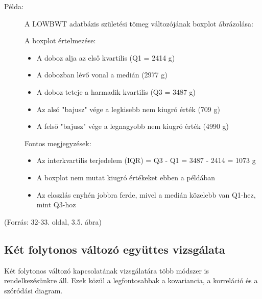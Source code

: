 \documentclass[a4paper,12pt]{article}
\begin{document}
\begin{description}
\item[Példa:] A LOWBWT adatbázis születési tömeg változójának boxplot ábrázolása:

\begin{center}
\end{center}

A boxplot értelmezése:
\begin{itemize}
    \item A doboz alja az első kvartilis (Q1 = 2414 g)
    \item A dobozban lévő vonal a medián (2977 g)
    \item A doboz teteje a harmadik kvartilis (Q3 = 3487 g)
    \item Az alsó "bajusz" vége a legkisebb nem kiugró érték (709 g)
    \item A felső "bajusz" vége a legnagyobb nem kiugró érték (4990 g)
\end{itemize}

Fontos megjegyzések:
\begin{itemize}
    \item Az interkvartilis terjedelem (IQR) = Q3 - Q1 = 3487 - 2414 = 1073 g
    \item A boxplot nem mutat kiugró értékeket ebben a példában
    \item Az eloszlás enyhén jobbra ferde, mivel a medián közelebb van Q1-hez, mint Q3-hoz
\end{itemize}
\end{description}

(Forrás: 32-33. oldal, 3.5. ábra)

\subsection{Két folytonos változó együttes vizsgálata}

Két folytonos változó kapcsolatának vizsgálatára több módszer is rendelkezésünkre áll. Ezek közül a legfontosabbak a kovariancia, a korreláció és a szóródási diagram.
\end{document}
